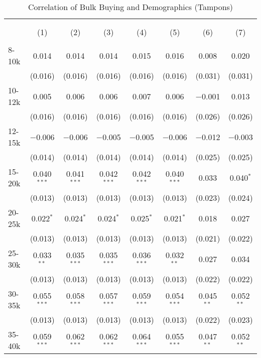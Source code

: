 
\begin{table}[!htbp] \centering 
  \caption{Correlation of Bulk Buying and Demographics (Tampons)} 
  \label{tab:discountingBehavior7270} 
\begin{tabular}{@{\extracolsep{5pt}}lccccccc} 
\\[-1.8ex]\hline 
\hline \\[-1.8ex] 
\\[-1.8ex] & (1) & (2) & (3) & (4) & (5) & (6) & (7)\\ 
\hline \\[-1.8ex] 
 8-10k & 0.014 & 0.014 & 0.014 & 0.015 & 0.016 & 0.008 & 0.020 \\ 
  & (0.016) & (0.016) & (0.016) & (0.016) & (0.016) & (0.031) & (0.031) \\ 
  10-12k & 0.005 & 0.006 & 0.006 & 0.007 & 0.006 & $-$0.001 & 0.013 \\ 
  & (0.016) & (0.016) & (0.016) & (0.016) & (0.016) & (0.026) & (0.026) \\ 
  12-15k & $-$0.006 & $-$0.006 & $-$0.005 & $-$0.005 & $-$0.006 & $-$0.012 & $-$0.003 \\ 
  & (0.014) & (0.014) & (0.014) & (0.014) & (0.014) & (0.025) & (0.025) \\ 
  15-20k & 0.040$^{***}$ & 0.041$^{***}$ & 0.042$^{***}$ & 0.042$^{***}$ & 0.040$^{***}$ & 0.033 & 0.040$^{*}$ \\ 
  & (0.013) & (0.013) & (0.013) & (0.013) & (0.013) & (0.023) & (0.024) \\ 
  20-25k & 0.022$^{*}$ & 0.024$^{*}$ & 0.024$^{*}$ & 0.025$^{*}$ & 0.021$^{*}$ & 0.018 & 0.027 \\ 
  & (0.013) & (0.013) & (0.013) & (0.013) & (0.013) & (0.021) & (0.022) \\ 
  25-30k & 0.033$^{**}$ & 0.035$^{***}$ & 0.035$^{***}$ & 0.036$^{***}$ & 0.032$^{**}$ & 0.027 & 0.034 \\ 
  & (0.013) & (0.013) & (0.013) & (0.013) & (0.013) & (0.022) & (0.022) \\ 
  30-35k & 0.055$^{***}$ & 0.058$^{***}$ & 0.057$^{***}$ & 0.059$^{***}$ & 0.054$^{***}$ & 0.045$^{**}$ & 0.052$^{**}$ \\ 
  & (0.013) & (0.013) & (0.013) & (0.013) & (0.013) & (0.022) & (0.023) \\ 
  35-40k & 0.059$^{***}$ & 0.062$^{***}$ & 0.062$^{***}$ & 0.064$^{***}$ & 0.055$^{***}$ & 0.047$^{**}$ & 0.052$^{**}$ \\ 

\end{tabular}
\end{table}
